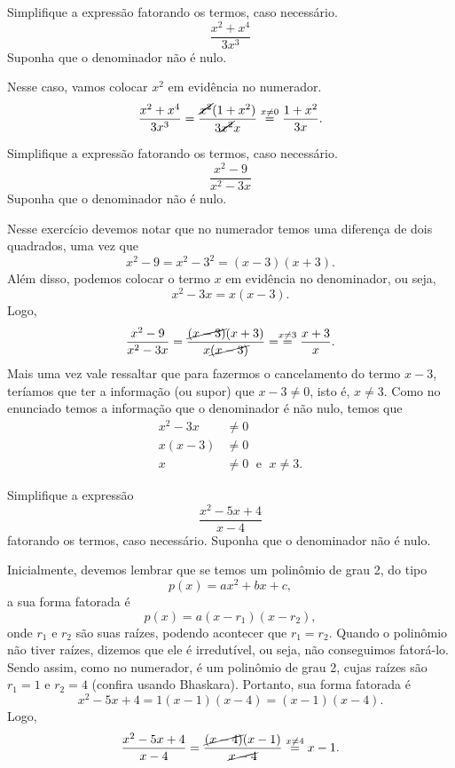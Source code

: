 \begin{example}
  Simplifique a expressão
  fatorando os termos, caso necessário.
  \[
    \frac{x^2+x^4}{3x^3}
  \]
  Suponha que o denominador não é nulo.

  \solution
  Nesse caso, vamos colocar $x^2$ em evidência no numerador.
  \[
    \frac{x^2+x^4}{3x^3}
    = \frac{\cancel{x^2}(1+x^2)}{3\cancel{x^2} x}
    \stackrel{x \neq 0}{=}\frac{1+x^2}{3x}.
  \]
\end{example}

\begin{example}
  Simplifique a expressão
  fatorando os termos, caso necessário.
  \[
    \frac{x^2-9}{x^2-3x}
  \]
  Suponha que o denominador não é nulo.

  \solution
  Nesse exercício devemos notar que no numerador temos uma diferença de dois
  quadrados, uma vez que
  \[
    x^2-9
    = x^2 - 3^2
    = (x-3)(x+3).
  \]
  Além disso, podemos colocar o termo $x$ em evidência no denominador,
  ou seja,
  \[
    x^2 - 3x = x(x-3).
  \]
  Logo,
  \[
    \frac{x^2-9}{x^2-3x}
    = \frac{\cancel{(x-3)}(x+3)}{x\cancel{(x-3)}}
    = \stackrel{x \neq 3}{=} \frac{x+3}{x}.
  \]
  Mais uma vez vale ressaltar que para fazermos o cancelamento do termo $x-3$,
  teríamos que ter a informação (ou supor) que
  $x-3 \neq 0$, isto é, $x \neq 3$.
  Como no enunciado temos a informação que o denominador é não nulo,
  temos que
  \begin{align*}
    x^2 - 3x & \neq 0 \\
    x(x-3)   & \neq 0 \\
    x        & \neq 0 \;\text{ e }\; x \neq 3.
  \end{align*}
\end{example}

\begin{example}
  Simplifique a expressão
  \[
    \frac{x^2-5x+4}{x-4}
  \]
  fatorando os termos, caso necessário.
  Suponha que o denominador não é nulo.

  \solution
  Inicialmente, devemos lembrar que se temos um polinômio de grau 2, do tipo
  \[
    p(x) = ax^2 + bx + c,
  \]
  a sua forma fatorada é
  \[
    p(x) = a(x-r_1)(x-r_2),
  \]
  onde $r_1$ e $r_2$ são suas raízes, podendo acontecer que $r_1=r_2$.
  Quando o polinômio não tiver raízes, dizemos que ele é irredutível, ou seja,
  não conseguimos fatorá-lo. Sendo assim, como no numerador, é um polinômio de
  grau 2, cujas raízes são $r_1=1$ e $r_2=4$ (confira usando Bhaskara). Portanto,
  sua forma fatorada é
  \[
    x^2 - 5x + 4
    = 1(x-1)(x-4)
    = (x-1)(x-4).
  \]
  Logo,
  \[
    \frac{x^2-5x+4}{x-4}
    =\frac{\cancel{(x-4)}(x-1)}{\cancel{x-4}}
    \stackrel{x \neq 4}{=} x-1.
  \]
\end{example}

